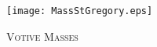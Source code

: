 \fancyhead[RE,LO]{}\fancyhead[RO,LE]{}
\fancyhead[C]{}\thispagestyle{empty}
{}
  \begin{center}
   \texttt{[image: MassStGregory.eps]}
   \par
   \vspace{2ex}
   	\textsc{\Huge{Votive Masses}}
   \end{center}